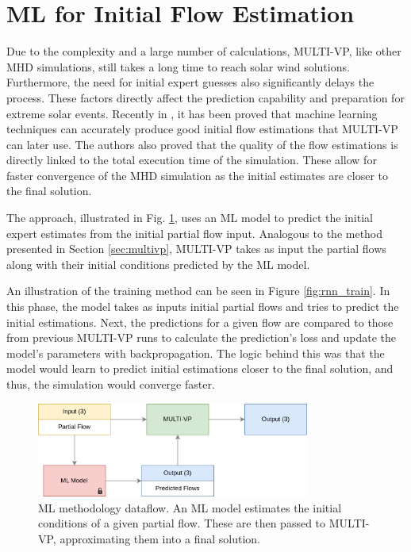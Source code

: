 \section{ML for Initial Flow Estimation}\label{sec:ml_initial_flow}
Due to the complexity and a large number of calculations, MULTI-VP, like other MHD simulations, still takes a long time to reach solar wind solutions. Furthermore, the need for initial expert guesses also significantly delays the process. These factors directly affect the prediction capability and preparation for extreme solar events. Recently in \cite{barros_InitialConditionEstimation_}, it has been proved that machine learning techniques can accurately produce good initial flow estimations that MULTI-VP can later use. The authors also proved that the quality of the flow estimations is directly linked to the total execution time of the simulation. These allow for faster convergence of the MHD simulation as the initial estimates are closer to the final solution. 

The approach, illustrated in Fig. \ref{fig:multivp_rnn}, uses an ML model to predict the initial expert estimates from the initial partial flow input. Analogous to the method presented in Section \ref{sec:multivp}, MULTI-VP takes as input the partial flows along with their initial conditions predicted by the ML model.

An illustration of the training method can be seen in Figure \ref*{fig:rnn_train}. In this phase, the model takes as inputs initial partial flows and tries to predict the initial estimations. Next, the predictions for a given flow are compared to those from previous MULTI-VP runs to calculate the prediction's loss and update the model's parameters with backpropagation. The logic behind this was that the model would learn to predict initial estimations closer to the final solution, and thus, the simulation would converge faster.

\begin{figure}[ht]
\centering
\includegraphics[width=0.8\textwidth]{figures/multivp_rnn.png}
\caption[ML methodology dataflow]{ML methodology dataflow. An ML model estimates the initial conditions of a given partial flow. These are then passed to MULTI-VP, approximating them into a final solution. \label{fig:multivp_rnn}}
\end{figure}

